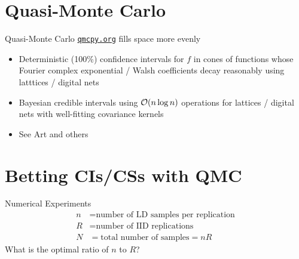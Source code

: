 \documentclass[11pt,compress,xcolor={usenames,dvipsnames},aspectratio=169]{beamer}
\begin{document}
\section{Quasi-Monte Carlo}
\begin{frame}{Quasi-Monte Carlo \href{https://qmcpy.org}{\nolinkurl{qmcpy.org}} fills space more evenly}

\begin{itemize}
    \item Deterministic (100\%) confidence intervals for $f$ in cones of functions whose Fourier complex exponential / Walsh coefficients decay reasonably using latttices / digital nets \parencite{HicJim16a, JimHic16a, HicEtal17a,JagSor23a}

    \item Bayesian credible intervals using $\operatorname{{\mathcal O}}(n \log n) $ operations for lattices / digital nets with well-fitting covariance kernels \parencite{RatHic19a,JagHic22a}

    \item See Art and others \parencite{LEcEtal24a,Owe26a}
\end{itemize}
    
\end{frame}

\section{Betting CIs/CSs with QMC}
\begin{frame}{Numerical Experiments}
\vspace{-15ex}
 \begin{align*}
    n &= \text{number of LD samples per replication}\\
    R & = \text{number of IID replications} \\
    N & = \text{total number of samples} = nR
\end{align*} 
What is the optimal ratio of $n$ to $R$?
\end{frame}
\end{document}

